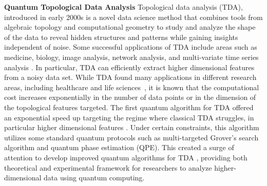 \documentclass{article}
\begin{document}
\vspace{.25cm}
\noindent\textbf{Quantum Topological Data Analysis} Topological data analysis (TDA), introduced in early 2000s \cite{carlssonTDA, edelsbrunnerTDA} is a novel data science method that combines tools from algebraic topology and computational geometry to study and analyze the shape of the data to reveal hidden structures and patterns while gaining insights independent of noise. Some successful applications of TDA include areas such as medicine, biology, image analysis, network analysis, and multi-variate time series analysis \cite{TDAbiologyfolding, TDAmedicinearrhythmia, TDAimageneural, TDAtimeseries}. In particular, TDA can efficiently extract higher dimensional features from a noisy data set. While TDA found many applications in different research areas, including healthcare and life sciences~\cite{Dey2022,Masoomy2021,Loughrey2021,Rabadan2020,Camara2017,Nicolau2011}, it is known that the computational cost increases exponentially in the number of data points or in the dimension of the topological features targeted. The first quantum algorithm for TDA offered an exponential speed up targeting the regime where classical TDA struggles, in particular higher dimensional features \cite{LGZalgorithm}. Under certain constraints, this algorithm utilizes some standard quantum protocols such as multi-targeted Grover's search algorithm and quantum phase estimation (QPE). This created a surge of attention to develop improved quantum algorithms for TDA \cite{ReviewQTDA, QTDAtowardsadv, QTDAhayakawa, schmidhuber2022complexitytheoretic, QTDAlindepth, QTDAlinexp}, providing both theoretical and experimental framework for researchers to analyze higher-dimensional data using quantum computing.
\end{document}
